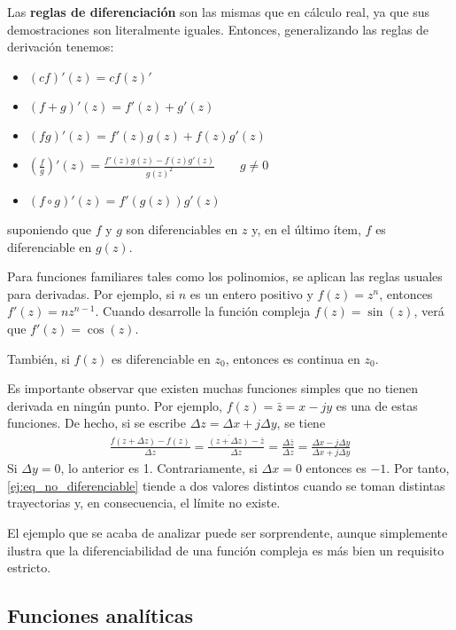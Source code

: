 Las \textbf{reglas de diferenciación} son las mismas que en cálculo real, ya que sus demostraciones son literalmente iguales. Entonces, generalizando las reglas de derivación tenemos:
\begin{itemize}
  \item $(cf)'(z)=cf(z)'$ 
  \item $(f+g)'(z)=f'(z)+g'(z)$
  \item $(fg)'(z)=f'(z)g(z)+f(z)g'(z)$
  \item $\left(\frac{f}{g}\right)'(z)=\frac{f'(z)g(z)-f(z)g'(z)}{g(z)^2}\qquad g\neq 0$
  \item $(f\circ g)'(z) = f'(g(z))g'(z)$
\end{itemize}
suponiendo que $f$ y $g$ son diferenciables en $z$ y, en el último ítem, $f$ es diferenciable en $g(z)$.

Para funciones familiares tales como los polinomios, se aplican las reglas usuales para derivadas. Por ejemplo, si $n$ es un entero positivo y $f(z)=z^n$, entonces $f'(z)=nz^{n-1}$. Cuando desarrolle la función compleja $f(z)=\sin(z)$, verá que $f'(z)=\cos(z)$. 

También, si $f(z)$ es diferenciable en $z_0$, entonces es continua en $z_0$.

\begin{example}
  Es importante observar que existen muchas funciones simples que no tienen derivada en ningún punto. Por ejemplo, $f(z)=\bar{z}=x-jy$ es una de estas funciones. De hecho, si se escribe $\Delta z = \Delta x + j\Delta y$, se tiene 
  \begin{align}
    \frac{f(z+\Delta z) - f(z)}{\Delta z} = \frac{\overline{(z+\Delta z)}-\bar{z}}{\Delta z} = \frac{{\Delta \bar{z}}}{\Delta z} = \frac{\Delta x - j\Delta y}{\Delta x + j\Delta y}
    \label{ej:eq_no_diferenciable}
  \end{align}
  Si $\Delta y = 0$, lo anterior es 1. Contrariamente, si $\Delta x = 0$ entonces es $-1$. Por tanto, \ref{ej:eq_no_diferenciable} tiende a dos valores distintos cuando se toman distintas trayectorias y, en consecuencia, el límite no existe.
  \label{ej:funcion_no_analitica}
\end{example}

El ejemplo que se acaba de analizar puede ser sorprendente, aunque simplemente ilustra que la diferenciabilidad de una función compleja es más bien un requisito estricto.

\subsection{Funciones analíticas}

